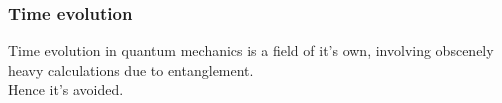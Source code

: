 \documentclass[
paper=128mm:96mm, %
fontsize=11pt, %
pagesize, %
parskip=half-, %
]{scrartcl} %
\theoremstyle{mythmstyle} %
\begin{document}
\clearpage

\subsubsection*{Time evolution}

Time evolution in quantum mechanics is a field of it's own, involving obscenely heavy calculations due to entanglement. \\

Hence it's avoided. \\

\clearpage



  \captionsetup[subfloat]{labelformat=empty}
\begin{figure}
 \begin{center}

\end{center}
\end{figure}
\end{document}

